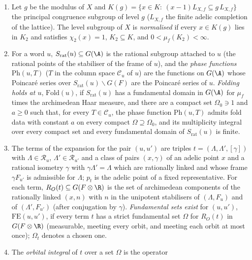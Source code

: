 \begin{definition}\label{pf:sh-siegel:folddef}
\begin{enumerate}[label=(\alph*)]
\item Let $g$ be the modulus of $X$ and $K(g)=\{x\in K:\ (x-1)L_{X,f}\subseteq g\,L_{X,f}\}$ the principal congruence
subgroup of level $g$ ($L_{X,f}$ the finite adelic completion of the lattice). The level subgroup of $X$ is
\emph{normalised} if every $x\in K(g)$ lies in $K_2$ and satisfies $\chi_2(x)=1$, $K_2\subseteq K$, and
$0<\mu_f(K_2)<\infty$.
\item For a word $u$, $S_{\mathrm{rat}}(u)\subseteq G(\A)$ is the rational subgroup attached to $u$ (the rational points of
the stabiliser of the frame of $u$), and the \emph{phase functions} $\mathrm{Ph}(u,T)$ ($T$ in the column space
$\mathcal C_u$ of $u$) are the functions on $G(\A)$ whose Poincar\'e series over $S_{\mathrm{rat}}(u)\backslash G(F)$ are
the Poincar\'e series of $u$. \emph{Folding holds at $u$}, $\mathrm{Fold}(u)$, if $S_{\mathrm{rat}}(u)$ has a fundamental
domain in $G(\A)$ for $\mu_f$ times the archimedean Haar measure, and there are a compact set $\Omega_0\ni1$ and $a\ge0$ such
that, for every $T\in\mathcal C_u$, the phase function $\mathrm{Ph}(u,T)$ admits fold data with constant $a$ on every compact
$\Omega\supseteq\Omega_0$, and its multiplicity integral over every compact set and every fundamental domain of
$S_{\mathrm{rat}}(u)$ is finite.
\item The terms of the expansion for the pair $(u,u')$ are triples $t=(\Lambda,\Lambda',[\gamma])$ with $\Lambda\in\mathcal
R_u$, $\Lambda'\in\mathcal R_{u'}$ and a class of pairs $(x,\gamma)$ of an adelic point $x$ and a rational isometry $\gamma$
with $\gamma\Lambda'=\Lambda$ which are rationally linked and whose frame $\gamma F_{u'}$ is admissible for $\Lambda$; $p_t$
is the adelic point of a fixed representative. For each term, $R_O(t)\subseteq G(F\otimes\R)$ is the set of archimedean
components of the rationally linked $(x,n)$ with $n$ in the unipotent stabilisers of $(\Lambda,F_u)$ and of
$(\Lambda',F_{u'})$ (after conjugation by $\gamma$). \emph{Fundamental sets exist} for $(u,u')$, $\mathrm{FE}(u,u')$, if every
term $t$ has a strict fundamental set $\Omega$ for $R_O(t)$ in $G(F\otimes\R)$ (measurable, meeting every orbit, and
meeting each orbit at most once); $\Omega_t$ denotes a chosen one.
\item The \emph{orbital integral} of $t$ over a set $\Omega$ is the operator

\end{enumerate}
\end{definition}
